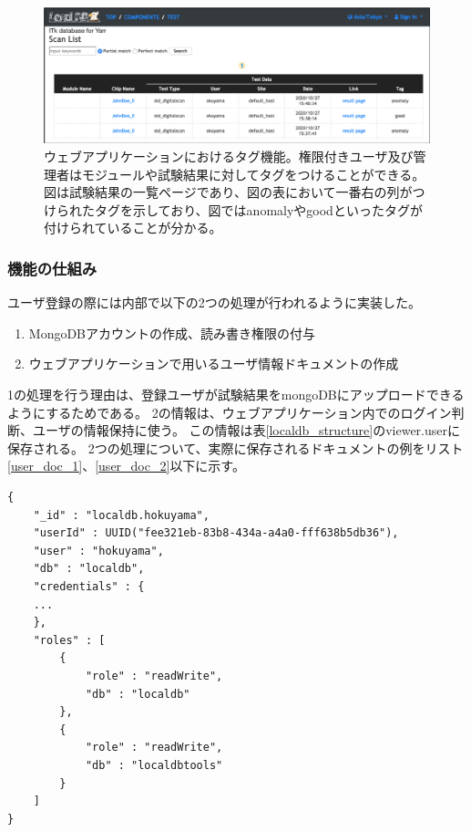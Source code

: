 \begin{figure}[bpt]\centering
\includegraphics[width=12cm]{./viewer_tag.png}
\caption[ウェブアプリケーションにおけるタグ機能]{ウェブアプリケーションにおけるタグ機能。権限付きユーザ及び管理者はモジュールや試験結果に対してタグをつけることができる。図は試験結果の一覧ページであり、図の表において一番右の列がつけられたタグを示しており、図ではanomalyやgoodといったタグが付けられていることが分かる。}
\label{webapp_tag}
\end{figure}

\clearpage

\subsubsection{機能の仕組み}
ユーザ登録の際には内部で以下の2つの処理が行われるように実装した。

\begin{enumerate}
  \item MongoDBアカウントの作成、読み書き権限の付与
  \item ウェブアプリケーションで用いるユーザ情報ドキュメントの作成
\end{enumerate}

1の処理を行う理由は、登録ユーザが試験結果をmongoDBにアップロードできるようにするためである。
2の情報は、ウェブアプリケーション内でのログイン判断、ユーザの情報保持に使う。
この情報は表\ref{localdb_structure}のviewer.userに保存される。
2つの処理について、実際に保存されるドキュメントの例をリスト\ref{user_doc_1}、\ref{user_doc_2}以下に示す。

\begin{lstlisting}[basicstyle=\scriptsize,caption=MongoDBアカウント情報を持つドキュメントの例。リスト中の"roles"より、localdbとlocaldbtoolsの読み書き権限が付加されていることが分かる。,label=user_doc_1]
{
	"_id" : "localdb.hokuyama",
	"userId" : UUID("fee321eb-83b8-434a-a4a0-fff638b5db36"),
	"user" : "hokuyama",
	"db" : "localdb",
	"credentials" : {
    ...
	},
	"roles" : [
		{
			"role" : "readWrite",
			"db" : "localdb"
		},
		{
			"role" : "readWrite",
			"db" : "localdbtools"
		}
	]
}
\end{lstlisting}

